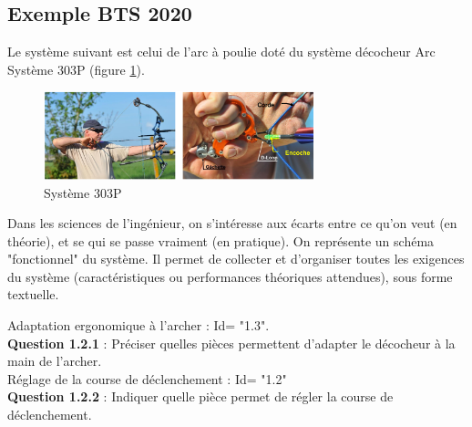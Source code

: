 \documentclass[
	11pt, %
	fleqn, %
	a4paper, %
]{LegrandOrangeBook}
\begin{document}
\subsection{Exemple BTS 2020}

Le système suivant est celui de l'arc à poulie doté du système décocheur Arc Système 303P (figure \ref{fleche1}). 
\begin{figure}[H] %
	\centering %
	\includegraphics[width=0.7\textwidth]{Images/fleche1.png} %
	\caption{Système 303P}
	\label{fleche1} %
\end{figure}
Dans les sciences de l'ingénieur, on s'intéresse aux écarts entre ce qu'on veut (en théorie), et se qui se passe vraiment (en pratique). On représente un schéma "fonctionnel" du système. Il permet de collecter et d'organiser toutes les exigences du système (caractéristiques ou performances théoriques attendues), sous forme textuelle. 



\begin{tcolorbox}[colback=gray!5!white,colframe=gray!75!ocre,title=Tiré du BTS 2020]
Adaptation ergonomique à l’archer : Id= "1.3". \\
\textbf{Question 1.2.1 }: Préciser quelles pièces permettent d’adapter le décocheur à la main de l’archer. \\


Réglage de la course de déclenchement : Id= "1.2"\\
\textbf{Question 1.2.2 }: Indiquer quelle pièce permet de régler la course de déclenchement.\\

\end{tcolorbox}



\begin{tcolorbox}[colback=gray!5!white,colframe=gray!75!gray,title=Réponses]


\vspace{8 cm}

\end{tcolorbox}
\end{document}
